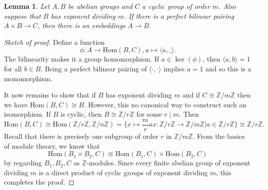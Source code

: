 \documentclass[12pt]{report}
\newtheorem{lemma}[theorem]{Lemma}
\theoremstyle{definition}
\newcommand{\zz}{\mathbb{Z}}
\newcommand{\ta}[1]{\langle #1 \rangle}
\newcommand{\Hom}{\text{Hom}}
\begin{document}
\begin{lemma}
	Let $A,B$ be abelian groups and $C$ a cyclic group of order $m$. Also suppose that $B$ has exponent dividing $m$. If there is a perfect bilinear pairing $A\times B\to C$, then there is an embeddings $A\to B$.
\end{lemma}

\begin{proof}[Sketch of proof]
	Define a function $$\phi:A\to \Hom(B,C), a\mapsto \ta{a,\_}.$$ The bilinearity makes it a group homomorphism. If $a\in\ker(\phi)$, then $\ta{a,b}=1$ for all $b\in B$. Being a perfect bilinear pairing of $\ta{\cdot,\cdot}$ implies $a=1$ and so this is a monomorphism.

	It now remains to show that if $B$ has exponent dividing $m$ and if $C\cong \zz/m\zz$ then we have $\Hom(B,C)\cong B$. However, this no canonical way to construct such an isomorphism. If $B$ is cyclic, then $B\cong \zz/r\zz$ for some $r\mid m$. Then $$\Hom(B,C)\cong\Hom(\zz/r\zz,\zz/n\zz)=\{x\mapsto \frac{m}{r}ax:\zz/r\zz\to\zz/m\zz | a\in \zz/r\zz \}\cong\zz/r\zz.$$ Recall that there is precisely one subgroup of order $r$ in $\zz/m\zz$. From the basics of module theory, we know that $$\Hom(B_1\times B_2, C)\cong \Hom(B_1,C)\times\Hom(B_2,C)$$ by regarding $B_1,B_2,C$ as $\zz$-modules. Since every finite abelian group of exponent dividing $m$ is a direct product of cyclic groups of exponent dividing $m$, this completes the proof.
\end{proof}
\end{document}

